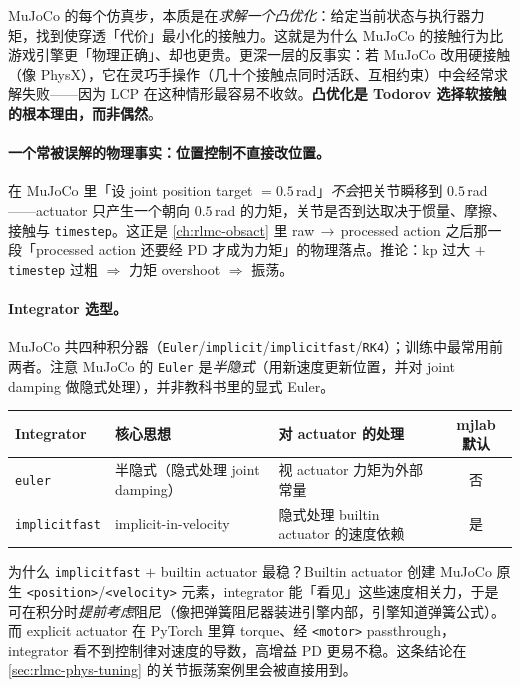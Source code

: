 \begin{insight}[每一步仿真都在解一个优化问题]\label{ins:rlmc-phys-convex}
MuJoCo 的每个仿真步，本质是在\emph{求解一个凸优化}：给定当前状态与执行器力矩，找到使穿透「代价」最小化的接触力。这就是为什么 MuJoCo 的接触行为比游戏引擎更「物理正确」、却也更贵。更深一层的反事实：若 MuJoCo 改用硬接触（像 PhysX），它在灵巧手操作（几十个接触点同时活跃、互相约束）中会经常求解失败——因为 LCP 在这种情形最容易不收敛。\textbf{凸优化是 Todorov 选择软接触的根本理由，而非偶然}。
\end{insight}

\paragraph{一个常被误解的物理事实：位置控制不直接改位置。}在 MuJoCo 里「设 joint position target $=0.5$\,rad」\emph{不会}把关节瞬移到 $0.5$\,rad——actuator 只产生一个朝向 $0.5$\,rad 的力矩，关节是否到达取决于惯量、摩擦、接触与 \verb|timestep|。这正是 \cref{ch:rlmc-obsact} 里 raw\,$\to$\,processed action 之后那一段「processed action 还要经 PD 才成为力矩」的物理落点。推论：kp 过大 $+$ \verb|timestep| 过粗 $\Rightarrow$ 力矩 overshoot $\Rightarrow$ 振荡。

\paragraph{Integrator 选型。}MuJoCo 共四种积分器（\verb|Euler|/\verb|implicit|/\verb|implicitfast|/\verb|RK4|）；训练中最常用前两者。注意 MuJoCo 的 \verb|Euler| 是\emph{半隐式}（用新速度更新位置，并对 joint damping 做隐式处理），并非教科书里的显式 Euler。

\begin{center}
\small
\begin{tabular}{@{}lp{4.4cm}p{4.0cm}c@{}}
\toprule
Integrator & 核心思想 & 对 actuator 的处理 & mjlab 默认 \\
\midrule
\verb|euler| & 半隐式（隐式处理 joint damping） & 视 actuator 力矩为外部常量 & 否 \\
\verb|implicitfast| & implicit-in-velocity & 隐式处理 builtin actuator 的速度依赖 & 是 \\
\bottomrule
\end{tabular}
\end{center}

为什么 \verb|implicitfast| $+$ builtin actuator 最稳？Builtin actuator 创建 MuJoCo 原生 \verb|<position>|/\verb|<velocity>| 元素，integrator 能「看见」这些速度相关力，于是可在积分时\emph{提前考虑}阻尼（像把弹簧阻尼器装进引擎内部，引擎知道弹簧公式）。而 explicit actuator 在 PyTorch 里算 torque、经 \verb|<motor>| passthrough，integrator 看不到控制律对速度的导数，高增益 PD 更易不稳。这条结论在 \cref{sec:rlmc-phys-tuning} 的关节振荡案例里会被直接用到。

